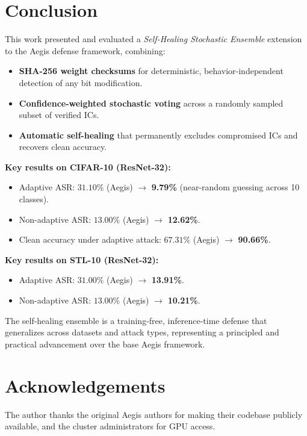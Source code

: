 \documentclass[12pt,a4paper]{article}
\newcommand{\asr}{\textsc{ASR}}
\newcommand{\ic}{\textsc{IC}}
\begin{document}
\section{Conclusion}
\label{sec:conclusion}

This work presented and evaluated a \textit{Self-Healing Stochastic Ensemble} extension to the Aegis defense framework, combining:
\begin{itemize}
    \item \textbf{SHA-256 weight checksums} for deterministic, behavior-independent detection of any bit modification.
    \item \textbf{Confidence-weighted stochastic voting} across a randomly sampled subset of verified \ic{}s.
    \item \textbf{Automatic self-healing} that permanently excludes compromised \ic{}s and recovers clean accuracy.
\end{itemize}

\noindent\textbf{Key results on CIFAR-10 (ResNet-32):}
\begin{itemize}
    \item Adaptive \asr{}: $31.10\%$ (Aegis) $\rightarrow$ \textbf{9.79\%} (near-random guessing across 10 classes).
    \item Non-adaptive \asr{}: $13.00\%$ (Aegis) $\rightarrow$ \textbf{12.62\%}.
    \item Clean accuracy under adaptive attack: $67.31\%$ (Aegis) $\rightarrow$ \textbf{90.66\%}.
\end{itemize}

\noindent\textbf{Key results on STL-10 (ResNet-32):}
\begin{itemize}
    \item Adaptive \asr{}: $31.00\%$ (Aegis) $\rightarrow$ \textbf{13.91\%}.
    \item Non-adaptive \asr{}: $13.00\%$ (Aegis) $\rightarrow$ \textbf{10.21\%}.
\end{itemize}

The self-healing ensemble is a training-free, inference-time defense that generalizes across datasets and attack types, representing a principled and practical advancement over the base Aegis framework.

\section*{Acknowledgements}
The author thanks the original Aegis authors for making their codebase publicly available, and the cluster administrators for GPU access.
\end{document}
